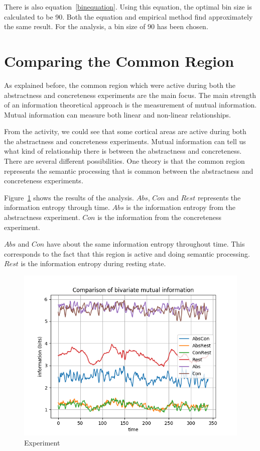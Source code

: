 There is also equation~\ref{binequation}. Using this equation, the optimal bin size is calculated to be 90. Both the equation and empirical method find approximately the same result. For the analysis, a bin size of 90 has been chosen. 

\section{Comparing the Common Region}\label{analysis1}

As explained before, the common region which were active during both the abstractness and concreteness experiments are the main focus. The main strength of an information theoretical approach is the measurement of mutual information. Mutual information can measure both linear and non-linear relationships. 

From the activity, we could see that some cortical areas are active during both the abstractness and concreteness experiments. Mutual information can tell us what kind of relationship there is between the abstractness and concreteness. There are several different possibilities. One theory is that the common region represents the semantic processing that is common between the abstractness and concreteness experiments.

Figure~\ref{all-channel-1} shows the results of the analysis. $Abs$, $Con$ and $Rest$ represents the information entropy through time. $Abs$ is the information entropy from the abstractness experiment. $Con$ is the information from the concreteness experiment. 

$Abs$ and $Con$ have about the same information entropy throughout time. This corresponds to the fact that this region is active and doing semantic processing. $Rest$ is the information entropy during resting state. 

\begin{figure}[!htb]
\caption{Experiment}
\label{all-channel-1}
    \centering
    \includegraphics[width=\textwidth]{fig/all-channel-1}
\end{figure}

